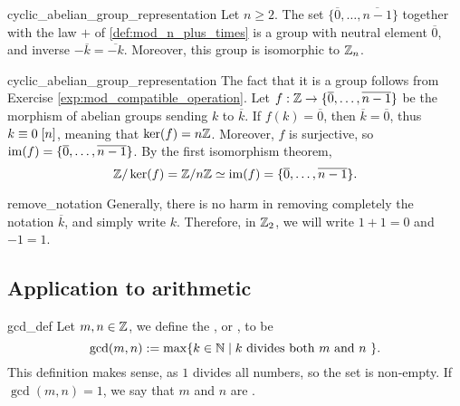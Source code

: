 \begin{cprop}{}{cyclic_abelian_group_representation}
    Let \( n \geq 2 \). The set \( \{ \overline 0, \dots, \overline {n-1} \} \) together with the law \( + \) of \ref{def:mod_n_plus_times} is a group with neutral element \( \overline 0 \), and inverse \( - \overline k = \overline{- k}  \). Moreover, this group is isomorphic to \( \mathbb{Z}_n \).
\end{cprop}
\begin{propproof}{cyclic_abelian_group_representation}
    The fact that it is a group follows from Exercise \ref{exp:mod_compatible_operation}. Let \( f : \mathbb{Z} \to \{ \overline 0, \dots, \overline {n-1} \} \) be the morphism of abelian groups sending \( k \) to \( \overline k \). If \( f(k) = \overline 0 \), then \( \overline k = \overline 0 \), thus \( k \equiv 0 \;[{n}]  \), meaning that \( \ker(f) = n\mathbb{Z} \). Moreover, \( f \) is surjective, so \( \operatorname{im}(f) = \{ \overline 0, \dots, \overline {n-1} \} \). By the first isomorphism theorem, 
    \begin{equation*}
        \mathbb{Z} / \ker(f) = \mathbb{Z} / n\mathbb{Z} \simeq \operatorname{im}(f) = \{ \overline 0, \dots, \overline {n-1} \}. 
    \end{equation*}
\end{propproof}

\begin{crem}{}{remove_notation}
    Generally, there is no harm in removing completely the notation \( \overline k \), and simply write \( k \). Therefore, in \( \mathbb{Z}_2 \), we will write \( 1 + 1 = 0 \) and \( -1 = 1 \).
\end{crem}

\subsection{Application to arithmetic}

\begin{cdef}{}{gcd_def}
    Let \( m, n \in \mathbb{Z} \), we define the , or , to be
    \begin{equation*}
        \gcd (m, n) := \max \{ k \in \mathbb{N} \mid k \text{ divides both \( m \) and \( n \) } \}.
    \end{equation*} 
    This definition makes sense, as \( 1 \) divides all numbers, so the set is non-empty.
    If \( \gcd(m, n) = 1 \), we say that \( m \) and \( n \) are .
\end{cdef}

